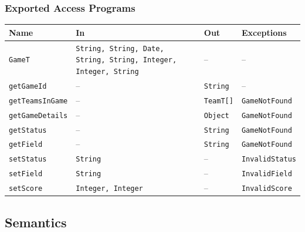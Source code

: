 \documentclass[12pt, titlepage]{article}
\begin{document}
\subsubsection{Exported Access Programs}
\begin{center}
  \begin{tabularx}{\textwidth}{@{}lXlX@{}}
    \toprule
    \textbf{Name}           & \textbf{In}                                                             & \textbf{Out}     & \textbf{Exceptions}    \\
    \midrule
    \texttt{GameT}          & \texttt{String, String, Date, String, String, Integer, Integer, String} & --               & --                     \\
    \texttt{getGameId}      & --                                                                      & \texttt{String}  & --                     \\
    \texttt{getTeamsInGame} & --                                                                      & \texttt{TeamT[]} & \texttt{GameNotFound}  \\
    \texttt{getGameDetails} & --                                                                      & \texttt{Object}  & \texttt{GameNotFound}  \\
    \texttt{getStatus}      & --                                                                      & \texttt{String}  & \texttt{GameNotFound}  \\
    \texttt{getField}       & --                                                                      & \texttt{String}  & \texttt{GameNotFound}  \\
    \texttt{setStatus}      & \texttt{String}                                                         & --               & \texttt{InvalidStatus} \\
    \texttt{setField}       & \texttt{String}                                                         & --               & \texttt{InvalidField}  \\
    \texttt{setScore}       & \texttt{Integer, Integer}                                               & --               & \texttt{InvalidScore}  \\
    \bottomrule
  \end{tabularx}
\end{center}

\subsection{Semantics}
\end{document}
